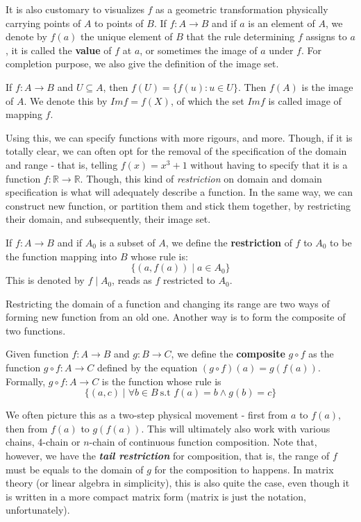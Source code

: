 It is also customary to visualizes $f$ as a geometric transformation physically carrying points of $A$ to points of $B$. If $f:A\to B$ and if $a$ is an element of $A$, we denote by $f(a)$ the unique element of $B$ that the rule determining \(f\) assigns to \(a\), it is called the \textbf{value} of $f$ at $a$, or sometimes the image of $a$ under $f$. For completion purpose, we also give the definition of the image set. 
\begin{definition}[Image]
    If $f: A\to B$ and $U\subseteq A$, then $f(U)=\{ f(u): u \in U \}$. Then $f(A)$ is the image of $A$. We denote this by $Imf=f(X)$, of which the set $Imf$ is called image of mapping $f$. 
\end{definition}
Using this, we can specify functions with more rigours, and more. Though, if it is totally clear, we can often opt for the removal of the specification of the domain and range - that is, telling $f(x)=x^3 +1$ without having to specify that it is a function $f: \mathbb{R}\to \mathbb{R}$. Though, this kind of \textit{restriction} on domain and domain specification is what will adequately describe a function. In the same way, we can construct new function, or partition them and stick them together, by restricting their domain, and subsequently, their image set. 
\begin{definition}[Restrictions]
    If $f: A\to B$ and if $A_0$ is a subset of $A$, we define the \textbf{restriction} of $f$ to $A_0$ to be the function mapping into $B$ whose rule is: 
    \begin{equation*}
        \{(a,f(a))\mid a\in A_0\} 
    \end{equation*}
    This is denoted by $f\mid A_0$, reads as $f$ restricted to $A_0$. 
\end{definition}
Restricting the domain of a function and changing its range are two ways of forming new function from an old one. Another way is to form the composite of two functions. 
\begin{definition}[Composition]
    Given function $f: A\to B$ and $g: B \to C$, we define the \textbf{composite} $g\circ f$ as the function $g\circ f: A\to C$ defined by the equation $(g\circ f)(a)=g(f(a))$. Formally, $g\circ f: A\to C$ is the function whose rule is \begin{equation}
        \{(a,c)\mid \forall b\in B \: \text{s.t }f(a)=b\land g(b)=c\}
    \end{equation}
\end{definition}
We often picture this as a two-step physical movement - first from $a$ to $f(a)$, then from $f(a)$ to $g(f(a))$. This will ultimately also work with various chains, 4-chain or $n$-chain of continuous function composition. Note that, however, we have the \textbf{\textit{tail restriction}} for composition, that is, the range of $f$ must be equals to the domain of $g$ for the composition to happens. In matrix theory (or linear algebra in simplicity), this is also quite the case, even though it is written in a more compact matrix form (matrix is just the notation, unfortunately). 

